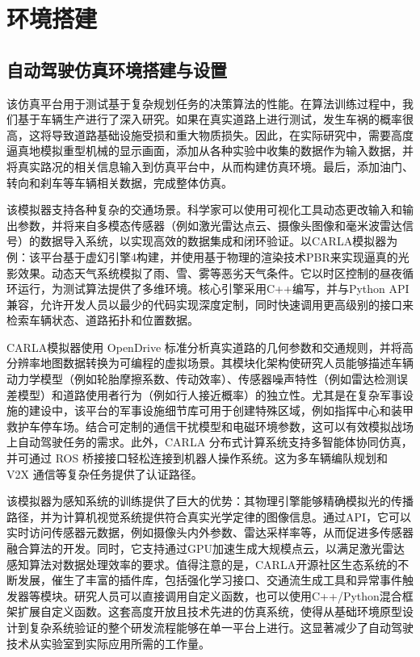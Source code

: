 \chapter{环境搭建}

\section{自动驾驶仿真环境搭建与设置}

该仿真平台用于测试基于复杂规划任务的决策算法的性能。在算法训练过程中，我们基于车辆生产进行了深入研究。如果在真实道路上进行测试，发生车祸的概率很高，这将导致道路基础设施受损和重大物质损失。因此，在实际研究中，需要高度逼真地模拟重型机械的显示画面，添加从各种实验中收集的数据作为输入数据，并将真实路况的相关信息输入到仿真平台中，从而构建仿真环境。最后，添加油门、转向和刹车等车辆相关数据，完成整体仿真。

该模拟器支持各种复杂的交通场景。科学家可以使用可视化工具动态更改输入和输出参数，并将来自多模态传感器（例如激光雷达点云、摄像头图像和毫米波雷达信号）的数据导入系统，以实现高效的数据集成和闭环验证。以CARLA模拟器为例：该平台基于虚幻引擎4构建，并使用基于物理的渲染技术PBR来实现逼真的光影效果。动态天气系统模拟了雨、雪、雾等恶劣天气条件。它以时区控制的昼夜循环运行，为测试算法提供了多维环境。核心引擎采用C++编写，并与Python API兼容，允许开发人员以最少的代码实现深度定制，同时快速调用更高级别的接口来检索车辆状态、道路拓扑和位置数据。

CARLA\cite{dosovitskiy2017carla}模拟器使用 OpenDrive 标准分析真实道路的几何参数和交通规则，并将高分辨率地图数据转换为可编程的虚拟场景。其模块化架构使研究人员能够描述车辆动力学模型（例如轮胎摩擦系数、传动效率）、传感器噪声特性（例如雷达检测误差模型）和道路使用者行为（例如行人接近概率）的独立性。尤其是在复杂军事设施的建设中，该平台的军事设施细节库可用于创建特殊区域，例如指挥中心和装甲救护车停车场。结合可定制的通信干扰模型和电磁环境参数，这可以有效模拟战场上自动驾驶任务的需求。此外，CARLA 分布式计算系统支持多智能体协同仿真，并可通过 ROS 桥接接口轻松连接到机器人操作系统。这为多车辆编队规划和 V2X 通信等复杂任务提供了认证路径。

该模拟器为感知系统的训练提供了巨大的优势：其物理引擎能够精确模拟光的传播路径，并为计算机视觉系统提供符合真实光学定律的图像信息。通过API，它可以实时访问传感器元数据，例如摄像头内外参数、雷达采样率等，从而促进多传感器融合算法的开发。同时，它支持通过GPU加速生成大规模点云，以满足激光雷达感知算法对数据处理效率的要求。值得注意的是，CARLA开源社区生态系统的不断发展，催生了丰富的插件库，包括强化学习接口、交通流生成工具和异常事件触发器等模块。研究人员可以直接调用自定义函数，也可以使用C++/Python混合框架扩展自定义函数。这套高度开放且技术先进的仿真系统，使得从基础环境原型设计到复杂系统验证的整个研发流程能够在单一平台上进行。这显著减少了自动驾驶技术从实验室到实际应用所需的工作量。

